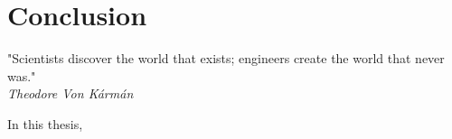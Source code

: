 \chapter{Conclusion}
\label{sec:Conclusion}

\begin{flushright}
\small"Scientists discover the world that exists; engineers create the world that never was." \\ \emph{Theodore Von Kármán}
\end{flushright}
\vspace{+10pt}




In this thesis,

